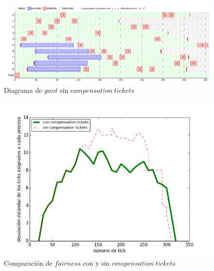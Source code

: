 \documentclass[a4paper]{article}
\begin{document}
\begin{figure}[H]
\centering
\includegraphics[scale=0.5]{../experimentacion/ej10-compensation/gant-con.png}
\caption{Diagrama de $gant$ sin $compensation\ tickets$}
\end{figure}

\begin{figure}[H]
\centering
\includegraphics[scale=0.66]{../experimentacion/ej10-compensation/plot-comparativa.png}
\caption{Comparación de $fairness$ con y sin $compensation\ tickets$}
\end{figure}
\end{document}

